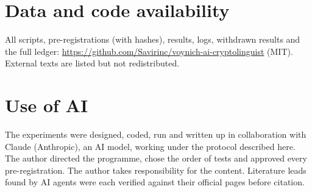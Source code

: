 \documentclass[11pt,a4paper]{article}
\begin{document}
\section*{Data and code availability}
All scripts, pre-registrations (with hashes), results, logs, withdrawn results and the full ledger: \url{https://github.com/Savirinc/voynich-ai-cryptolinguist} (MIT). External texts are listed but not redistributed.

\section*{Use of AI}
The experiments were designed, coded, run and written up in collaboration with Claude (Anthropic), an AI model, working under the protocol described here. The author directed the programme, chose the order of tests and approved every pre-registration. The author takes responsibility for the content. Literature leads found by AI agents were each verified against their official pages before citation.



\end{document}
